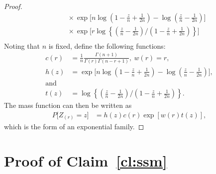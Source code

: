 \documentclass[12pt]{article}
\theoremstyle{plain}
\theoremstyle{remark}
\begin{document}
\begin{appendix}
\begin{proof}
\begin{align*}
	&\hspace{15pt} \times  \exp\bigg[ n\log\left(1-\frac{z}{n} + \frac{1}{2n}\right) - \log \left(\frac{z}{n} - \frac{1}{2n}\right) \bigg] \\
	&\hspace{15pt} \times \exp\bigg[ r\log \left\{\left(\frac{z}{n} - \frac{1}{2n}\right) \bigg/ \left(1-\frac{z}{n} + \frac{1}{2n}\right) \right\}\bigg]\\
\end{align*}
Noting that $n$ is fixed, define the following functions: 
\begin{align*}
	c(r) &= \frac{1}{n}\frac{\Gamma(n+1)}{\Gamma(r)\Gamma(n - r + 1)},\ w(r) = r,\\
	h(z) &= \exp\bigg[ n\log\left(1-\frac{z}{n} + \frac{1}{2n}\right) - \log \left(\frac{z}{n} - \frac{1}{2n}\right) \bigg],\\
	\text{and}\\
	 t(z) &= \log \left\{\left(\frac{z}{n} - \frac{1}{2n}\right) \bigg/ \left(1-\frac{z}{n} + \frac{1}{2n}\right) \right\}.
\end{align*} 
The mass function can then be written as
\begin{align*}
	P\bigg[ Z_{(r)} = z \bigg]  &= h(z)c(r)\exp\left[ w(r)t(z) \right],
\end{align*}
which is the form of an exponential family. 
\end{proof}

\section{Proof of Claim~\ref{cl:ssm}}\label{appx:ev}


\end{appendix}
\end{document}
